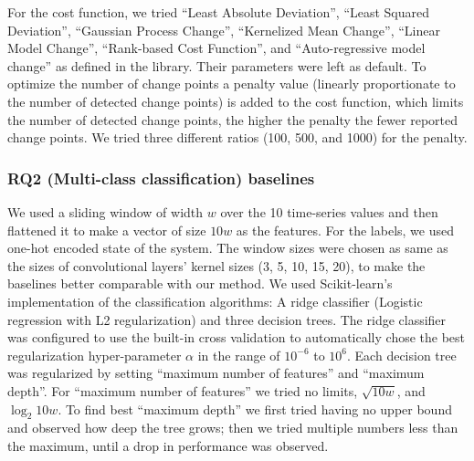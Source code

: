 For the cost function, we tried ``Least Absolute Deviation'', ``Least Squared Deviation'', ``Gaussian Process Change'', ``Kernelized Mean Change'', ``Linear Model Change'', ``Rank-based Cost Function'', and ``Auto-regressive model change'' as defined in the library. Their parameters were left as default.
To optimize the number of change points a penalty value (linearly proportionate to the number of detected change points) is added to the cost function, which limits the number of detected change points, the higher the penalty the fewer reported change points. We tried three different ratios (100, 500, and 1000) for the penalty.


\subsubsection{RQ2 (Multi-class classification) baselines}
We used a sliding window of width $w$ over the 10 time-series values and then flattened it to make a vector of size $10w$ as the features. For the labels, we used one-hot encoded state of the system.
The window sizes were chosen as same as the sizes of convolutional layers' kernel sizes (3, 5, 10, 15, 20), to make the baselines better comparable with our method. 
We used Scikit-learn's implementation of the classification algorithms: A ridge classifier (Logistic regression with L2 regularization) and three decision trees. The ridge classifier was configured to use the built-in cross validation to automatically chose the best regularization hyper-parameter $\alpha$ in the range of $10^{-6}$ to $10^6$. Each decision tree was regularized by setting ``maximum number of features'' and ``maximum depth''. For ``maximum number of features'' we tried no limits, $\sqrt{10w}$, and $\log_2{10w}$. To find best ``maximum depth'' we first tried having no upper bound and observed how deep the tree grows; then we tried multiple numbers less than the maximum, until a drop in performance was observed. 

